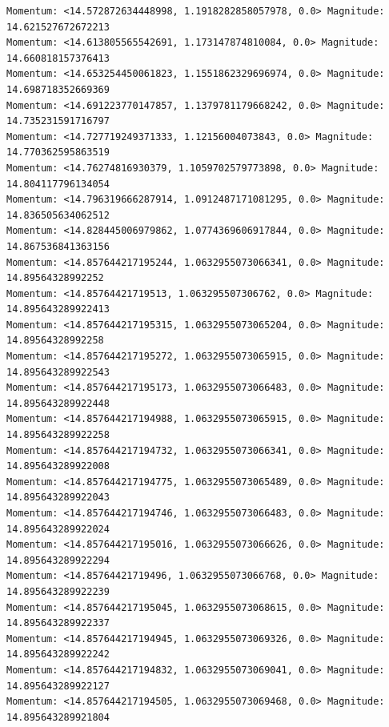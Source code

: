 \documentclass[10pt]{article}
\begin{document}
\begin{verbatim}
Momentum: <14.572872634448998, 1.1918282858057978, 0.0> Magnitude: 14.621527672672213
Momentum: <14.613805565542691, 1.173147874810084, 0.0> Magnitude: 14.660818157376413
Momentum: <14.653254450061823, 1.1551862329696974, 0.0> Magnitude: 14.698718352669369
Momentum: <14.691223770147857, 1.1379781179668242, 0.0> Magnitude: 14.735231591716797
Momentum: <14.727719249371333, 1.12156004073843, 0.0> Magnitude: 14.770362595863519
Momentum: <14.76274816930379, 1.1059702579773898, 0.0> Magnitude: 14.804117796134054
Momentum: <14.796319666287914, 1.0912487171081295, 0.0> Magnitude: 14.836505634062512
Momentum: <14.828445006979862, 1.0774369606917844, 0.0> Magnitude: 14.867536841363156
Momentum: <14.857644217195244, 1.0632955073066341, 0.0> Magnitude: 14.89564328992252
Momentum: <14.85764421719513, 1.063295507306762, 0.0> Magnitude: 14.895643289922413
Momentum: <14.857644217195315, 1.0632955073065204, 0.0> Magnitude: 14.89564328992258
Momentum: <14.857644217195272, 1.0632955073065915, 0.0> Magnitude: 14.895643289922543
Momentum: <14.857644217195173, 1.0632955073066483, 0.0> Magnitude: 14.895643289922448
Momentum: <14.857644217194988, 1.0632955073065915, 0.0> Magnitude: 14.895643289922258
Momentum: <14.857644217194732, 1.0632955073066341, 0.0> Magnitude: 14.895643289922008
Momentum: <14.857644217194775, 1.0632955073065489, 0.0> Magnitude: 14.895643289922043
Momentum: <14.857644217194746, 1.0632955073066483, 0.0> Magnitude: 14.895643289922024
Momentum: <14.857644217195016, 1.0632955073066626, 0.0> Magnitude: 14.895643289922294
Momentum: <14.85764421719496, 1.0632955073066768, 0.0> Magnitude: 14.895643289922239
Momentum: <14.857644217195045, 1.0632955073068615, 0.0> Magnitude: 14.895643289922337
Momentum: <14.857644217194945, 1.0632955073069326, 0.0> Magnitude: 14.895643289922242
Momentum: <14.857644217194832, 1.0632955073069041, 0.0> Magnitude: 14.895643289922127
Momentum: <14.857644217194505, 1.0632955073069468, 0.0> Magnitude: 14.895643289921804
\end{verbatim}
\small
\end{document}
